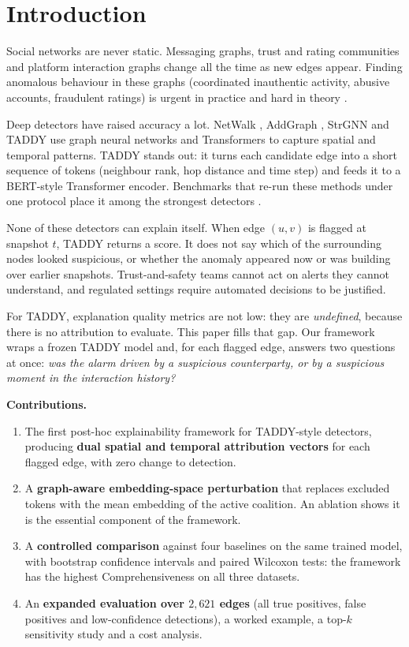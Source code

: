 \documentclass[conference]{IEEEtran}
\begin{document}
\section{Introduction}
\label{sec:intro}

Social networks are never static. Messaging graphs, trust and rating
communities and platform interaction graphs change all the time as new edges
appear. Finding anomalous behaviour in these graphs (coordinated inauthentic
activity, abusive accounts, fraudulent ratings) is urgent in practice and hard
in theory \cite{akoglu2015graph}.

Deep detectors have raised accuracy a lot. NetWalk \cite{yu2018netwalk},
AddGraph \cite{zheng2019addgraph}, StrGNN \cite{cai2021strgnn} and TADDY
\cite{liu2021taddy} use graph neural networks and Transformers to capture
spatial and temporal patterns. TADDY stands out: it turns each candidate edge
into a short sequence of tokens (neighbour rank, hop distance and time step) and
feeds it to a BERT-style Transformer encoder. Benchmarks that re-run these
methods under one protocol place it among the strongest detectors
\cite{nekka2026survey}.

None of these detectors can explain itself. When edge $(u,v)$ is flagged at
snapshot $t$, TADDY returns a score. It does not say which of the surrounding
nodes looked suspicious, or whether the anomaly appeared now or was building
over earlier snapshots. Trust-and-safety teams cannot act on alerts they cannot
understand, and regulated settings require automated decisions to be justified.

For TADDY, explanation quality metrics are not low: they are
\emph{undefined}, because there is no attribution to evaluate. This paper fills
that gap. Our framework wraps a frozen TADDY model and, for each flagged edge,
answers two questions at once: \emph{was the alarm driven by a suspicious
counterparty, or by a suspicious moment in the interaction history?}

\noindent\textbf{Contributions.}
\begin{enumerate}
\item The first post-hoc explainability framework for TADDY-style detectors,
producing \textbf{dual spatial and temporal attribution vectors} for each
flagged edge, with zero change to detection.
\item A \textbf{graph-aware embedding-space perturbation} that replaces excluded
tokens with the mean embedding of the active coalition. An ablation shows it is
the essential component of the framework.
\item A \textbf{controlled comparison} against four baselines on the same
trained model, with bootstrap confidence intervals and paired Wilcoxon tests:
the framework has the highest Comprehensiveness on all three datasets.
\item An \textbf{expanded evaluation over $2{,}621$ edges} (all true positives,
false positives and low-confidence detections), a worked example, a top-$k$
sensitivity study and a cost analysis.
\end{enumerate}
\end{document}

